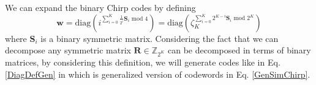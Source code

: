 \noindent We can expand the binary Chirp codes by defining 
\begin{equation}
	\mathbf{w} = \text{diag}\left(i^{\sum_{i=0}^{K}{\frac{1}{2^i}\mathbf{S}_i} \text{ mod } 4}\right)=\text{diag}\left(\zeta_K^{\sum_{i=0}^{K}{2^{K-i}\mathbf{S}_i} \text{ mod }2^K }\right)
\end{equation}
where $\mathbf{S}_i$ is a binary symmetric matrix. Considering the fact that we can decompose any symmetric matrix $\mathbf{R}\in \mathbb{Z}_{2^K}$ can be decomposed in terms of binary matrices, by considering this definition, we will generate codes like in Eq. \eqref{DiagDefGen} in which is generalized version of codewords in Eq. \eqref{GenSimChirp}.







